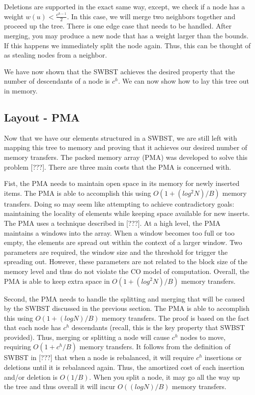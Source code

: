 \documentclass{style}
\begin{document}
Deletions are supported in the exact same way, except, we check if a node has
a weight $w(u) < \frac{c^{h-1}}{2}$. In this case, we will merge two neighbors
together and proceed up the tree. There is one edge case that needs to be
handled. After merging, you may produce a new node that has a weight larger
than the bounds. If this happens we immediately split the node again. Thus,
this can be thought of as stealing nodes from a neighbor.

We have now shown that the SWBST achieves the desired property that the number
of descendants of a node is $c^h$. We can now show how to lay this tree out in
memory.

\subsection{Layout - PMA}
\label{sec:layout}


Now that we have our elements structured in a SWBST, we are still left with
mapping this tree to memory and proving that it achieves our desired number of
memory transfers. The packed memory array (PMA) was developed to solve this
problem [???]. There are three main costs that the PMA is concerned with.

Fist, the PMA needs to maintain open space in its memory for newly inserted
items. The PMA is able to accomplish this using $O(1 + (log^2 N) / B)$ memory
transfers. Doing so may seem like attempting to achieve contradictory goals:
maintaining the locality of elements while keeping space available for new
inserts. The PMA uses a technique described in [???]. At a high level, the PMA
maintains a windows into the array. When a window becomes too full or too
empty, the elements are spread out within the context of a larger window. Two
parameters are required, the window size and the threshold for trigger the
spreading out. However, these parameters are not related to the block size of
the memory level and thus do not violate the CO model of computation. Overall,
the PMA is able to keep extra space in $O(1 + (log^2 N) / B)$ memory
transfers.

Second, the PMA needs to handle the splitting and merging that will be caused
by the SWBST discussed in the previous section. The PMA is able to accomplish
this using $O(1 + (log N) /B)$ memory transfers. The proof is based on the
fact that each node has $c^h$ descendants (recall, this is the key property
that SWBST provided). Thus, merging or splitting a node will cause $c^h$ nodes
to move, requiring $O(1 + c^h/B)$ memory transfers. It follows from the
definition of SWBST in [???] that when a node is rebalanced, it will require
$c^h$ insertions or deletions until it is rebalanced again. Thus, the
amortized cost of each insertion and/or deletion is $O(1/B)$. When you split a
node, it may go all the way up the tree and thus overall it will incur $O((log
N) / B)$ memory transfers.
\end{document}
